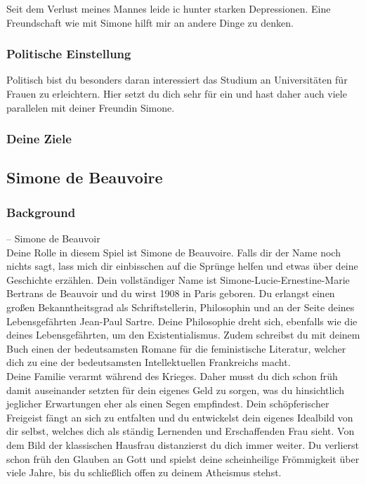 \documentclass[12pt, a4paper, openany]{report}
\begin{document}
Seit dem Verlust meines Mannes leide ic hunter starken Depressionen. Eine Freundschaft wie mit Simone hilft mir an andere Dinge zu denken.
\subsubsection{Politische Einstellung}
Politisch bist du besonders daran interessiert das Studium an Universitäten für Frauen zu erleichtern. Hier setzt du dich sehr für ein und hast daher auch viele parallelen mit deiner Freundin Simone. 
\subsubsection{Deine Ziele}

\subsection{Simone de Beauvoire}
 
\subsubsection{Background}


– Simone de Beauvoir\\


Deine Rolle in diesem Spiel ist Simone de Beauvoire. Falls dir der Name noch nichts sagt, lass mich dir einbisschen auf die Sprünge helfen und etwas über deine Geschichte erzählen. 
Dein vollständiger Name ist Simone-Lucie-Ernestine-Marie Bertrans de Beauvoir und du wirst 1908 in Paris geboren. Du erlangst einen großen Bekanntheitsgrad als Schriftstellerin, Philosophin und an der Seite deines Lebensgefährten Jean-Paul Sartre. Deine Philosophie dreht sich, ebenfalls wie die deines Lebensgefährten, um den Existentialismus. Zudem schreibst du mit deinem Buch  einen der bedeutsamsten Romane für die feministische Literatur, welcher dich zu eine der bedeutsamsten Intellektuellen Frankreichs macht. \\

Deine Familie verarmt während des Krieges. Daher musst du dich schon früh damit auseinander setzten für dein eigenes Geld zu sorgen, was du hinsichtlich jeglicher Erwartungen eher als einen Segen empfindest. Dein schöpferischer Freigeist fängt an sich zu entfalten und du entwickelst dein eigenes Idealbild von dir selbst, welches dich als ständig Lernenden und Erschaffenden Frau sieht. Von dem Bild der klassischen Hausfrau distanzierst du dich immer weiter. Du verlierst schon früh den Glauben an Gott und spielst deine scheinheilige Frömmigkeit über viele Jahre, bis du schließlich offen zu deinem Atheismus stehst. \\
\end{document}
